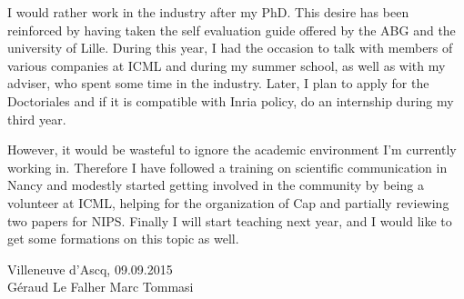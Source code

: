 
I would rather work in the industry after my PhD. This desire has been
reinforced by having taken the self evaluation guide offered by the ABG and the
university of Lille. During this year, I had the occasion to talk with members
of various companies at ICML and during my summer school, as well as with my
adviser, who spent some time in the industry. Later, I plan to apply for the
Doctoriales and if it is compatible with Inria policy, do an internship during
my third year.

However, it would be wasteful to ignore the academic environment I'm currently
working in. Therefore I have followed a training on scientific communication in
Nancy and modestly started getting involved in the community by being a
volunteer at ICML, helping for the organization of Cap and partially reviewing
two papers for NIPS. Finally I will start teaching next year, and I would like
to get some formations on this topic as well.

\vspace{4em}
\begin{center}
    Villeneuve d'Ascq, 09.09.2015 \\
    Géraud Le Falher \hspace{10em} Marc Tommasi
\end{center}

